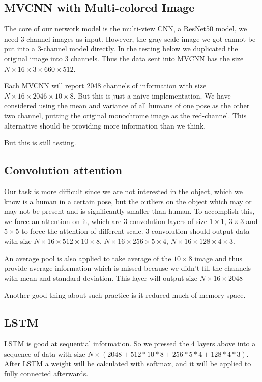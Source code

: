 \documentclass[conference,compsoc]{IEEEtran}
\begin{document}
\subsection{MVCNN with Multi-colored Image}
The core of our network model is the multi-view CNN, a ResNet50 model, we need 3-channel images as input. 
However, the gray scale image we got cannot be put into a 3-channel model directly. 
In the testing below we duplicated the original image into 3 channels. 
Thus the data sent into MVCNN has the size $N\times16\times 3\times 660 \times 512$.
\par 
Each MVCNN will report 2048 channels of information with size $N \times 16 \times 2046 \times 10 \times 8$.
But this is just a naive implementation. We have considered using the mean and variance of all humans of one pose as the other two channel, putting the original monochrome image as the red-channel. This alternative should be providing more information than we think. 
\par But this is still testing.

\subsection{Convolution attention}
Our task is more difficult since we are not interested in the object, which we know is a human in a certain pose, but the outliers on the object which may or may not be present and is significantly smaller than human. To accomplish this, we force an attention on it, which are 3 convolution layers of size $1\times1$, $3\times3$ and $5\times5$ to force the attention of different scale. 3 convolution should output data with size $N\times16\times512\times 10\times8$, $N\times16\times256\times5\times4$, $N\times16\times128\times4\times3$.
\par An average pool is also applied to take average of the $10\times8$ image and thus provide average information which is missed because we didn't fill the channels with mean and standard deviation. This layer will output size $N\times 16\times 2048$
\par Another good thing about such practice is it reduced much of memory space.

\subsection{LSTM}
\par
LSTM is good at sequential information. So we pressed the 4 layers above into a sequence of data with size $N\times(2048+512*10*8+256*5*4+128*4*3)$. After LSTM a weight will be calculated with softmax, and it will be applied to fully connected afterwards.
\end{document}
